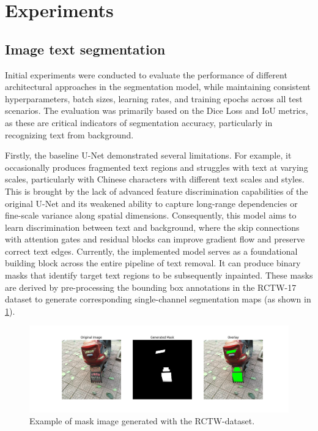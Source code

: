 \documentclass[10pt,twocolumn,letterpaper]{article}
\begin{document}
\section{Experiments}

\subsection{Image text segmentation}
Initial experiments were conducted to evaluate the performance of different architectural approaches in the segmentation model, while maintaining consistent 
hyperparameters, batch sizes, learning rates, and training epochs across all test scenarios. The evaluation was primarily based on the Dice Loss and 
IoU metrics, as these are critical indicators of segmentation accuracy, particularly in recognizing text from background.

Firstly, the baseline U-Net demonstrated several limitations. For example, it occasionally produces fragmented text regions and struggles with text at varying scales, 
particularly with Chinese characters with different text scales and styles. This is brought by the lack of advanced feature discrimination capabilities of the original 
U-Net and its weakened ability to capture long-range dependencies or fine-scale variance along spatial dimensions. Consequently, this model aims to learn 
discrimination between text and background, where the skip connections with attention gates and residual blocks can improve gradient flow and preserve correct text edges. 
Currently, the implemented model serves as a foundational building block across the entire pipeline of text removal. It can produce binary masks that identify target text regions 
to be subsequently inpainted. These masks are derived by pre-processing the bounding box annotations in the RCTW-17 dataset to generate corresponding single-channel segmentation maps 
(as shown in \cref{fig:verify}).

\begin{figure}[t]
    \centering
    \includegraphics[width=\linewidth]{figures/milestone/verify_1.png}
    \caption{Example of mask image generated with the RCTW-dataset.}
    \label{fig:verify}
\end{figure}
\end{document}

